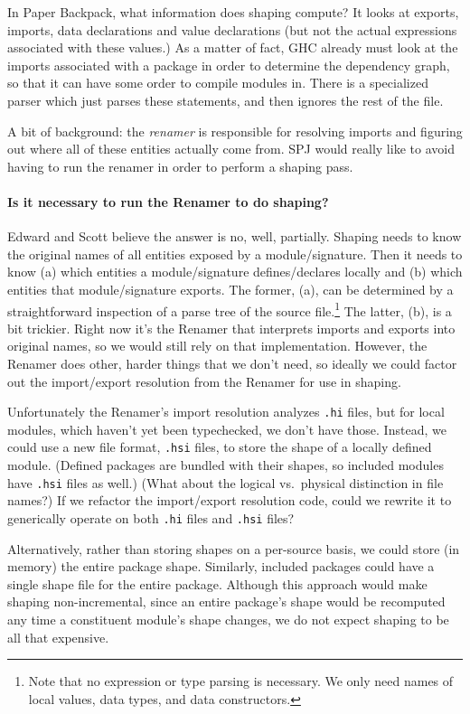 \documentclass{article}
\begin{document}
In Paper Backpack, what information does shaping compute? It looks at
exports, imports, data declarations and value declarations (but not the
actual expressions associated with these values.)  As a matter of fact,
GHC already must look at the imports associated with a package in order
to determine the dependency graph, so that it can have some order to compile
modules in.  There is a specialized parser which just parses these statements,
and then ignores the rest of the file.

A bit of background: the \emph{renamer} is responsible for resolving
imports and figuring out where all of these entities actually come from.
SPJ would really like to avoid having to run the renamer in order to perform
a shaping pass.

\paragraph{Is it necessary to run the Renamer to do shaping?}
Edward and Scott believe the answer is no, well, partially.
Shaping needs to know the original names of all entities exposed by a
module/signature. Then it needs to know (a) which entities a module/signature
defines/declares locally and (b) which entities that module/signature exports.
The former, (a), can be determined by a straightforward inspection of a parse
tree of the source file.\footnote{Note that no expression or type parsing
is necessary. We only need names of local values, data types, and data
constructors.} The latter, (b), is a bit trickier. Right now it's the Renamer
that interprets imports and exports into original names, so we would still
rely on that implementation. However, the Renamer does other, harder things
that we don't need, so ideally we could factor out the import/export
resolution from the Renamer for use in shaping.

Unfortunately the Renamer's import resolution analyzes \verb|.hi| files, but for
local modules, which haven't yet been typechecked, we don't have those.
Instead, we could use a new file format, \verb|.hsi| files, to store the shape of
a locally defined module. (Defined packages are bundled with their shapes,
so included modules have \verb|.hsi| files as well.) (What about the logical
vs.~physical distinction in file names?) If we refactor the import/export
resolution code, could we rewrite it to generically operate on both
\verb|.hi| files and \verb|.hsi| files?

Alternatively, rather than storing shapes on a per-source basis, we could
store (in memory) the entire package shape. Similarly, included packages
could have a single shape file for the entire package. Although this approach
would make shaping non-incremental, since an entire package's shape would
be recomputed any time a constituent module's shape changes, we do not expect
shaping to be all that expensive.
\end{document}
